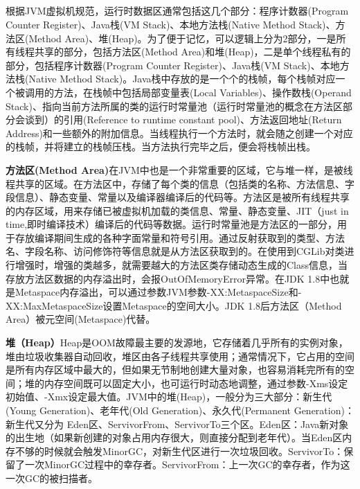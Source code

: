 \documentclass[../../../interview-questions.tex]{subfiles}
\begin{document}
\subsection{\color{red}{Java内存模型(Java Memory Model)}}

根据JVM虚拟机规范，运行时数据区通常包括这几个部分：程序计数器(Program Counter Register)、Java栈(VM Stack)、本地方法栈(Native Method Stack)、方法区(Method Area)、堆(Heap)。为了便于记忆，可以逻辑上分为2部分，一是所有线程共享的部分，包括方法区(Method Area)和堆(Heap)，二是单个线程私有的部分，包括程序计数器(Program Counter Register)、Java栈(VM Stack)、本地方法栈(Native Method Stack)。Java栈中存放的是一个个的栈帧，每个栈帧对应一个被调用的方法，在栈帧中包括局部变量表(Local Variables)、操作数栈(Operand Stack)、指向当前方法所属的类的运行时常量池（运行时常量池的概念在方法区部分会谈到）的引用(Reference to runtime constant pool)、方法返回地址(Return Address)和一些额外的附加信息。当线程执行一个方法时，就会随之创建一个对应的栈帧，并将建立的栈帧压栈。当方法执行完毕之后，便会将栈帧出栈。

\textbf{方法区(Method Area)}在JVM中也是一个非常重要的区域，它与堆一样，是被线程共享的区域。在方法区中，存储了每个类的信息（包括类的名称、方法信息、字段信息）、静态变量、常量以及编译器编译后的代码等。方法区是被所有线程共享的内存区域，用来存储已被虚拟机加载的类信息、常量、静态变量、JIT（just in time,即时编译技术）编译后的代码等数据。运行时常量池是方法区的一部分，用于存放编译期间生成的各种字面常量和符号引用。通过反射获取到的类型、方法名、字段名称、访问修饰符等信息就是从方法区获取到的。在使用到CGLib对类进行增强时，增强的类越多，就需要越大的方法区类存储动态生成的Class信息，当存放方法区数据的内存溢出时，会报OutOfMemoryError异常。在JDK 1.8中也就是Metaspace内存溢出，可以通过参数JVM参数-XX:MetaspaceSize和-XX:MaxMetaspaceSize设置Metaspace的空间大小。JDK 1.8后方法区（Method Area）被元空间(Metaspace)代替。

\textbf{堆（Heap）}Heap是OOM故障最主要的发源地，它存储着几乎所有的实例对象，堆由垃圾收集器自动回收，堆区由各子线程共享使用；通常情况下，它占用的空间是所有内存区域中最大的，但如果无节制地创建大量对象，也容易消耗完所有的空间；堆的内存空间既可以固定大小，也可运行时动态地调整，通过参数-Xms设定初始值、-Xmx设定最大值。JVM中的堆(Heap)，一般分为三大部分：新生代(Young Generation)、老年代(Old Generation)、永久代(Permanent Generation)：新生代又分为 Eden区、ServivorFrom、ServivorTo三个区。Eden区：Java新对象的出生地（如果新创建的对象占用内存很大，则直接分配到老年代）。当Eden区内存不够的时候就会触发MinorGC，对新生代区进行一次垃圾回收。ServivorTo：保留了一次MinorGC过程中的幸存者。ServivorFrom：上一次GC的幸存者，作为这一次GC的被扫描者。
\end{document}
